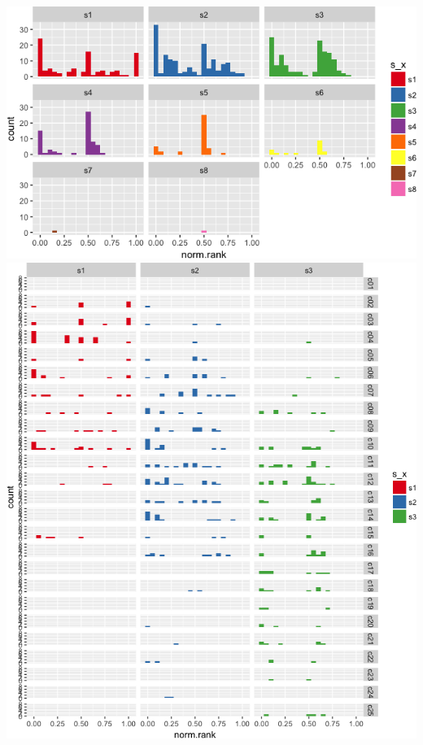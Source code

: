 \documentclass[]{article}
\begin{document}
\includegraphics{vn_files/figure-latex/crank3-1.png}
\includegraphics{vn_files/figure-latex/crank4-1.png}
\end{document}
